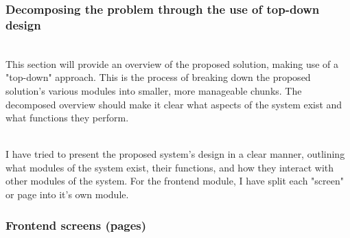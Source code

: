 \documentclass[../../main.tex]{subfiles}
\begin{document}
\begin{comment}
\node (home_details) [mb_node, below of=home, xshift=2.5cm] {System information};
\node (home_stats) [mb_node, below of=home_details, xshift=-0.4cm] {Usage statistics};

\node (item_photo) [mb_node, below of=item, xshift=2cm] {Photo(s) card};
\node (item_check) [mb_node, below of=item_photo] {Check in/out};
\node (item_entity) [mb_node, below of=item_check] {Entity list};
\node (item_history) [mb_node, below of=item_entity] {Entity history};

\node (entity_check) [mb_node, below of=entity, xshift=2cm] {Check in/out};
\node (entity_history) [mb_node, below of=entity_check] {History};

\end{comment}

\subsubsection{Decomposing the problem through the use of top-down design}

\noindent \\ This section will provide an overview of the proposed solution,
making use of a "top-down" approach. This is the process of breaking down the proposed
solution's various modules into smaller, more manageable chunks.
The decomposed overview should make it clear what aspects of the system exist and what
functions they perform.

\noindent \\ I have tried to present the proposed system's design in a clear manner,
outlining what modules of the system exist, their functions, and how they interact
with other modules of the system. For the frontend module, I have split each "screen" or page into it's
own module.

\subsubsection{Frontend screens (pages)}

\end{document}
